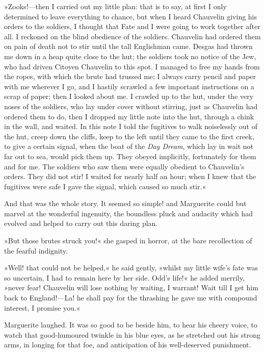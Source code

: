 »Zooks!—then I carried out my little plan: that is to say, at first I only determined to leave everything to chance, but when I heard Chauvelin giving his orders to the soldiers, I thought that Fate and I were going to work together after all. I reckoned on the blind obedience of the soldiers. Chauvelin had ordered them on pain of death not to stir until the tall Englishman came. Desgas had thrown me down in a heap quite close to the hut; the soldiers took no notice of the Jew, who had driven Citoyen Chauvelin to this spot. I managed to free my hands from the ropes, with which the brute had trussed me; I always carry pencil and paper with me wherever I go, and I hastily scrawled a few important instructions on a scrap of paper; then I looked about me. I crawled up to the hut, under the very noses of the soldiers, who lay under cover without stirring, just as Chauvelin had ordered them to do, then I dropped my little note into the hut, through a chink in the wall, and waited. In this note I told the fugitives to walk noiselessly out of the hut, creep down the cliffs, keep to the left until they came to the first creek, to give a certain signal, when the boat of the \textit{Day Dream}, which lay in wait not far out to sea, would pick them up. They obeyed implicitly, fortunately for them and for me. The soldiers who saw them were equally obedient to Chauvelin's orders. They did not stir! I waited for nearly half an hour; when I knew that the fugitives were safe I gave the signal, which caused so much stir.«

And that was the whole story. It seemed so simple! and Marguerite could but marvel at the wonderful ingenuity, the boundless pluck and audacity which had evolved and helped to carry out this daring plan.

»But those brutes struck you!« she gasped in horror, at the bare recollection of the fearful indignity.

»Well! that could not be helped,« he said gently, »whilst my little wife's fate was so uncertain, I had to remain here by her side. Odd's life!« he added merrily, »never fear! Chauvelin will lose nothing by waiting, I warrant! Wait till I get him back to England!—La! he shall pay for the thrashing he gave me with compound interest, I promise you.«

Marguerite laughed. It was so good to be beside him, to hear his cheery voice, to watch that good-humoured twinkle in his blue eyes, as he stretched out his strong arms, in longing for that foe, and anticipation of his well-deserved punishment.

